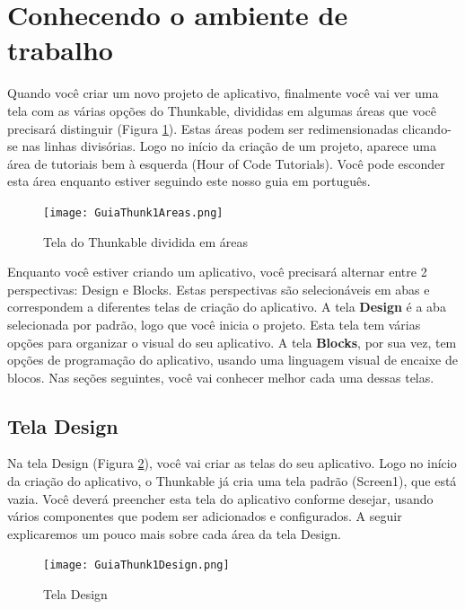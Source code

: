 \documentclass[11pt,fleqn]{book} %
\begin{document}

\section{Conhecendo o ambiente de trabalho}

Quando você criar um novo projeto de aplicativo, finalmente você vai ver uma tela com as várias opções do Thunkable, divididas em algumas áreas que você precisará distinguir (Figura \ref{fig:areas}). Estas áreas podem ser redimensionadas clicando-se nas linhas divisórias. Logo no início da criação de um projeto, aparece uma área de tutoriais bem à esquerda (Hour of Code Tutorials). Você pode esconder esta área enquanto estiver seguindo este nosso guia em português.

\begin{figure}[H]
    \centering
    \texttt{[image: GuiaThunk1Areas.png]}
    \caption{Tela do Thunkable dividida em áreas}\label{fig:areas}
\end{figure}

Enquanto você estiver criando um aplicativo, você precisará alternar entre 2 perspectivas: Design e Blocks. Estas perspectivas são selecionáveis em abas e correspondem a diferentes telas de criação do aplicativo. A tela \textbf{Design} é a aba selecionada por padrão, logo que você inicia o projeto. Esta tela tem várias opções para organizar o visual do seu aplicativo. A tela \textbf{Blocks}, por sua vez, tem opções de programação do aplicativo, usando uma linguagem visual de encaixe de blocos. Nas seções seguintes, você vai conhecer melhor cada uma dessas telas.


\subsection{Tela Design} 
Na tela Design (Figura \ref{fig:teladesign}), você vai criar as telas do seu aplicativo. Logo no início da criação do aplicativo, o Thunkable já cria uma tela padrão (Screen1), que está vazia. Você deverá preencher esta tela do aplicativo conforme desejar, usando vários componentes que podem ser adicionados e configurados. A seguir explicaremos um pouco mais sobre cada área da tela Design.

\begin{figure}[H]
    \centering
    \texttt{[image: GuiaThunk1Design.png]}
    \caption{Tela Design}\label{fig:teladesign}
\end{figure}
\end{document}
